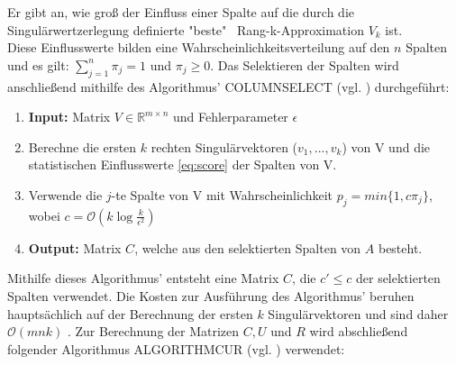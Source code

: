 \documentclass[12pt,a4paper,twoside]{article}
\begin{document}
		Er gibt an, wie groß der Einfluss einer Spalte auf die durch die Singulärwertzerlegung definierte "beste" \ Rang-k-Approximation $V_k$ ist. \\
		Diese Einflusswerte bilden eine Wahrscheinlichkeitsverteilung auf den $n$ Spalten und es gilt: $\sum_{j=1}^n\pi_j=1$ und $\pi_j\geq 0$. \newline
		Das Selektieren der Spalten wird anschließend mithilfe des Algorithmus' COLUMNSELECT (vgl. \citep{mahoney2008}) durchgeführt: 
		\begin{enumerate}
			\item \textbf{Input:} Matrix $V\in \mathds{R}^{m\times n}$ und Fehlerparameter $\epsilon$
			\item Berechne die ersten $k$ rechten Singulärvektoren ($v_1,...,v_k$) von V und die statistischen Einflusswerte \ref{eq:score} der Spalten von V.
			\item Verwende die $j$-te Spalte von V mit Wahrscheinlichkeit $p_j=min\{1,c\pi_j\}$, wobei $c=\mathcal{O}(k \log \frac{k}{\epsilon^2})$
			\item \textbf{Output:} Matrix $C$, welche aus den selektierten Spalten von $A$ besteht.
		\end{enumerate}
		Mithilfe dieses Algorithmus' entsteht eine Matrix $C$, die $c'\leq c$ der selektierten Spalten verwendet. Die 
		Kosten zur Ausführung des Algorithmus' beruhen hauptsächlich auf der Berechnung der ersten $k$ 
		Singulärvektoren und sind daher $\mathcal{O}(mnk)$ \citep{mahoney2008}.\newline
		Zur Berechnung der Matrizen $C,U$ und $R$ wird abschließend folgender Algorithmus ALGORITHMCUR (vgl. \citep{mahoney2008}) verwendet: \newpage
\end{document}

